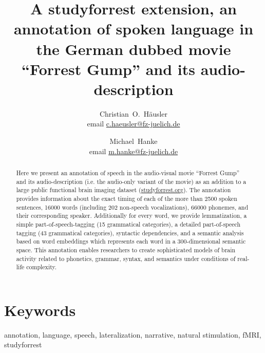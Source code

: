 \documentclass[10pt,a4paper,onecolumn]{article}
\begin{document}



\title{A studyforrest extension, an annotation of spoken language in the German dubbed movie ``Forrest Gump'' and its audio-description}

\author[1, 2]{Christian~O.~Häusler \\ email \href{mailto:c.haeusler@fz-juelich.de}{c.haeusler@fz-juelich.de} }
\author[1, 2]{Michael~Hanke \\ email \href{mailto:m.hanke@fz-juelich.de}{m.hanke@fz-juelich.de} }


\maketitle


 \thispagestyle{fancy} \begin{abstract}
Here we present an annotation of speech in the audio-visual movie ``Forrest
Gump'' and its audio-description (i.e. the audio-only variant of the movie) as
an addition to a large public functional brain imaging dataset
(\href{www.studyforrest.org}{studyforrest.org}). The annotation provides
information about the exact timing of each of the more than 2500 spoken
sentences, 16000 words (including 202 non-speech vocalizations), 66000 phonemes,
and their corresponding speaker. Additionally for every word, we provide
lemmatization, a simple part-of-speech-tagging (15 grammatical categories), a
detailed part-of-speech tagging (43 grammatical categories), syntactic
dependencies, and a semantic analysis based on word embeddings which represents
each word in a 300-dimensional semantic space. This annotation enables
researchers to create sophisticated models of brain activity related to
phonetics, grammar, syntax, and semantics under conditions of real-life
complexity.  \end{abstract}


\section*{Keywords}
annotation, language, speech, lateralization, narrative, natural stimulation, fMRI, studyforrest
\end{document}

